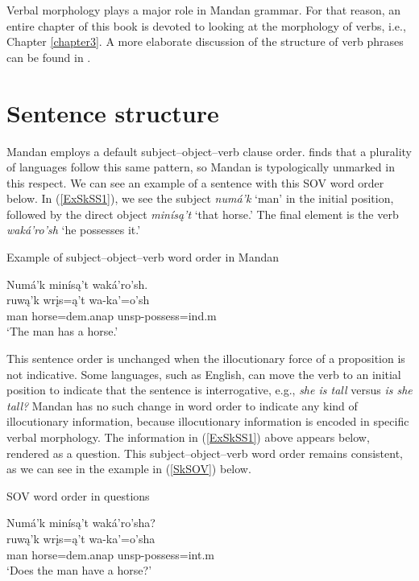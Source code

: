 Verbal morphology plays a major role in Mandan grammar. For that reason, an entire chapter of this book is devoted to looking at the morphology of verbs, i.e., Chapter \ref{chapter3}. A more elaborate discussion of the structure of verb phrases can be found in .

\section{Sentence structure}\label{CHSk6}

Mandan employs a default subject--object--verb clause order. \citet{dryer2013} finds that a plurality of languages follow this same pattern, so Mandan is typologically unmarked in this respect. We can see an example of a sentence with this SOV word order below. In (\ref{ExSkSS1}), we see the subject \textit{numá'k} `man' in the initial position, followed by the direct object \textit{minísą't} `that horse.' The final element is the verb \textit{waká'ro'sh} `he possesses it.'

\begin{exe}
    \item\label{ExSkSS1} Example of subject--object--verb word order in Mandan

    \glll Numá'k minísą't waká'ro'sh.\\
    ruwą'k wrįs=ą't wa-ka'=o'sh\\
    \textnormal{man} \textnormal{horse}=dem.anap unsp-\textnormal{possess}=ind.m\\
    \glt `The man has a horse.' \citep[32]{hollow1976}
\end{exe}

This sentence order is unchanged when the illocutionary force of a proposition is not indicative. Some languages, such as English, can move the verb to an initial position to indicate that the sentence is interrogative, e.g., \textit{she is tall} versus \textit{is she tall?} Mandan has no such change in word order to indicate any kind of illocutionary information, because illocutionary information is encoded in specific verbal morphology. The information in (\ref{ExSkSS1}) above appears below, rendered as a question. This subject--object--verb word order remains consistent, as we can see in the example in (\ref{SkSOV}) below.

\begin{exe}
\item\label{SkSOV} SOV word order in questions

    \glll Numá'k minísą't waká'ro'sha?\\
    ruwą'k wrįs=ą't wa-ka'=o'sha\\
    \textnormal{man} \textnormal{horse}=dem.anap unsp-\textnormal{possess}=int.m\\
    \glt `Does the man have a horse?'
    
\end{exe}

